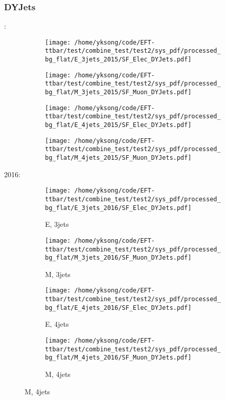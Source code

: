 \documentclass{beamer}
\begin{document}
\begin{frame}
\frametitle{DYJets}
\fontsize{5}{1}:
\begin{figure}
\centering
\begin{subfigure}[b]{0.24\textwidth}
\texttt{[image: /home/yksong/code/EFT-ttbar/test/combine\_test/test2/sys\_pdf/processed\_bg\_flat/E\_3jets\_2015/SF\_Elec\_DYJets.pdf]}
\end{subfigure}
\begin{subfigure}[b]{0.24\textwidth}
\texttt{[image: /home/yksong/code/EFT-ttbar/test/combine\_test/test2/sys\_pdf/processed\_bg\_flat/M\_3jets\_2015/SF\_Muon\_DYJets.pdf]}
\end{subfigure}
\begin{subfigure}[b]{0.24\textwidth}
\texttt{[image: /home/yksong/code/EFT-ttbar/test/combine\_test/test2/sys\_pdf/processed\_bg\_flat/E\_4jets\_2015/SF\_Elec\_DYJets.pdf]}
\end{subfigure}
\begin{subfigure}[b]{0.24\textwidth}
\texttt{[image: /home/yksong/code/EFT-ttbar/test/combine\_test/test2/sys\_pdf/processed\_bg\_flat/M\_4jets\_2015/SF\_Muon\_DYJets.pdf]}
\end{subfigure}
\end{figure}
2016:
\begin{figure}
\centering
\begin{subfigure}[b]{0.24\textwidth}
\texttt{[image: /home/yksong/code/EFT-ttbar/test/combine\_test/test2/sys\_pdf/processed\_bg\_flat/E\_3jets\_2016/SF\_Elec\_DYJets.pdf]}
\captionsetup{font=tiny}
\caption{E, 3jets}
\end{subfigure}
\begin{subfigure}[b]{0.24\textwidth}
\texttt{[image: /home/yksong/code/EFT-ttbar/test/combine\_test/test2/sys\_pdf/processed\_bg\_flat/M\_3jets\_2016/SF\_Muon\_DYJets.pdf]}
\captionsetup{font=tiny}
\caption{M, 3jets}
\end{subfigure}
\begin{subfigure}[b]{0.24\textwidth}
\texttt{[image: /home/yksong/code/EFT-ttbar/test/combine\_test/test2/sys\_pdf/processed\_bg\_flat/E\_4jets\_2016/SF\_Elec\_DYJets.pdf]}
\captionsetup{font=tiny}
\caption{E, 4jets}
\end{subfigure}
\begin{subfigure}[b]{0.24\textwidth}
\texttt{[image: /home/yksong/code/EFT-ttbar/test/combine\_test/test2/sys\_pdf/processed\_bg\_flat/M\_4jets\_2016/SF\_Muon\_DYJets.pdf]}
\captionsetup{font=tiny}
\caption{M, 4jets}
\end{subfigure}
\end{figure}
\end{frame}
\end{document}
